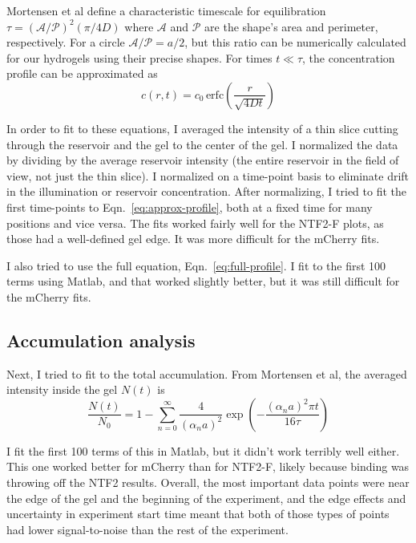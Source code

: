 Mortensen et al define a characteristic timescale for equilibration $\tau = (\mathcal{A}/\mathcal{P})^2 (\pi/4D)$ where $\mathcal{A}$ and $\mathcal{P}$ are the shape's area and perimeter, respectively.  For a circle $\mathcal{A}/\mathcal{P} = a/2$, but this ratio can be numerically calculated for our hydrogels using their precise shapes.  For times $t \ll \tau$, the concentration profile can be approximated as 
\begin{equation}
c(r,t) = c_0 \,\mathrm{erfc}\left(\frac{r}{\sqrt{4Dt}}\right)
\label{eq:approx-profile}
\end{equation}

In order to fit to these equations, I averaged the intensity of a thin slice cutting through the reservoir and the gel to the center of the gel.  I normalized the data by dividing by the average reservoir intensity (the entire reservoir in the field of view, not just the thin slice).  I normalized on a time-point basis to eliminate drift in the illumination or reservoir concentration.  After normalizing, I tried to fit the first time-points to Eqn.~\ref{eq:approx-profile}, both at a fixed time for many positions and vice versa.  The fits worked fairly well for the NTF2-F plots, as those had a well-defined gel edge.  It was more difficult for the mCherry fits.

I also tried to use the full equation, Eqn.~\ref{eq:full-profile}.  I fit to the first 100 terms using Matlab, and that worked slightly better, but it was still difficult for the mCherry fits.
\subsection{Accumulation analysis}
Next, I tried to fit to the total accumulation.  From Mortensen et al, the averaged intensity inside the gel $N(t)$ is
\begin{equation}
\frac{N(t)}{N_0} = 1-\sum_{n=0}^\infty \frac{4}{(\alpha_na)^2}\exp\left(-\frac{(\alpha_na)^2\pi t}{16\tau}\right)
\label{eq:full-accumulation}
\end{equation}

I fit the first 100 terms of this in Matlab, but it didn't work terribly well either.  This one worked better for mCherry than for NTF2-F, likely because binding was throwing off the NTF2 results.  Overall, the most important data points were near the edge of the gel and the beginning of the experiment, and the edge effects and uncertainty in experiment start time meant that both of those types of points had lower signal-to-noise than the rest of the experiment.

